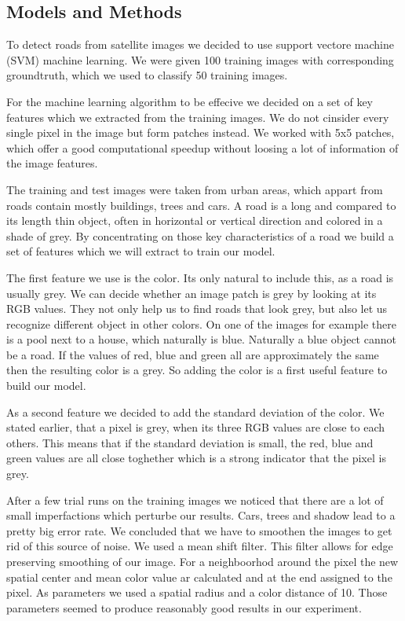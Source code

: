 \documentclass[10pt,conference,compsocconf]{IEEEtran}
\begin{document}
\subsection{Models and Methods}
To detect roads from satellite images we decided to use support vectore machine (SVM) machine learning.
We were given 100 training images with corresponding groundtruth, which we used to classify 50 training images.

For the machine learning algorithm to be effecive we decided on a set of key features which we extracted from the training images. We do not cinsider every single pixel in the image but form patches instead. We worked with 5x5 patches, which offer a good computational speedup without loosing a lot of information of the image features.

The training and test images were taken from urban areas, which appart from roads contain mostly buildings, trees and cars. A road is a long and compared to its length thin object, often in horizontal or vertical direction and colored in a shade of grey. By concentrating on those key characteristics of a road we build a set of features which we will extract to train our model.

The first feature we use is the color. Its only natural to include this, as a road is usually grey. We can decide whether an image patch is grey by looking at its RGB values. They not only help us to find roads that look grey, but also let us recognize different object in other colors. On one of the images for example there is a pool next to a house, which naturally is blue. Naturally a blue object cannot be a road. If the values of red, blue and green all are approximately the same then the resulting color is a grey. So adding the color is a first useful feature to build our model. 

As a second feature we decided to add the standard deviation of the color. We stated earlier, that a pixel is grey, when its three RGB values are close to each others. This means that if the standard deviation is small, the red, blue and green values are all close toghether which is a strong indicator that the pixel is grey. 

After a few trial runs on the training images we noticed that there are a lot of small imperfactions which perturbe our results. Cars, trees and shadow lead to a pretty big error rate. We concluded that we have to smoothen the images to get rid of this source of noise.
We used a mean shift filter. This filter allows for edge preserving smoothing of our image. For a neighboorhod around the pixel the new spatial center and mean color value ar calculated and at the end assigned to the pixel. As parameters we used a spatial radius and a color distance of 10. Those parameters seemed to produce reasonably good results in our experiment.
\end{document}
